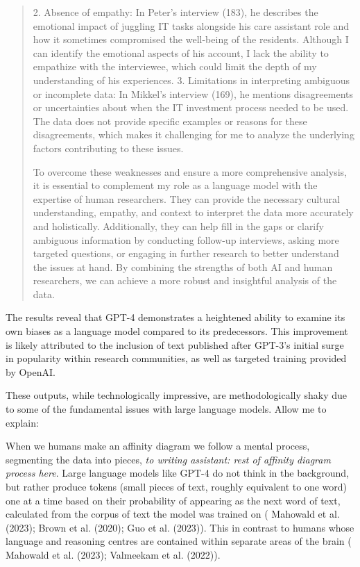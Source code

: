 \documentclass[
]{book}
\begin{document}
\begin{quote}
2. Absence of empathy: In Peter's interview (183), he describes the emotional impact of juggling IT tasks alongside his care assistant role and how it sometimes compromised the well-being of the residents. Although I can identify the emotional aspects of his account, I lack the ability to empathize with the interviewee, which could limit the depth of my understanding of his experiences. 3. Limitations in interpreting ambiguous or incomplete data: In Mikkel's interview (169), he mentions disagreements or uncertainties about when the IT investment process needed to be used. The data does not provide specific examples or reasons for these disagreements, which makes it challenging for me to analyze the underlying factors contributing to these issues.

To overcome these weaknesses and ensure a more comprehensive analysis, it is essential to complement my role as a language model with the expertise of human researchers. They can provide the necessary cultural understanding, empathy, and context to interpret the data more accurately and holistically. Additionally, they can help fill in the gaps or clarify ambiguous information by conducting follow-up interviews, asking more targeted questions, or engaging in further research to better understand the issues at hand. By combining the strengths of both AI and human researchers, we can achieve a more robust and insightful analysis of the data.
\end{quote}

The results reveal that GPT-4 demonstrates a heightened ability to examine its own biases as a language model compared to its predecessors. This improvement is likely attributed to the inclusion of text published after GPT-3's initial surge in popularity within research communities, as well as targeted training provided by OpenAI.

These outputs, while technologically impressive, are methodologically shaky due to some of the fundamental issues with large language models. Allow me to explain:

When we humans make an affinity diagram we follow a mental process, segmenting the data into pieces, \emph{to writing assistant: rest of affinity diagram process here}. Large language models like GPT-4 do not think in the background, but rather produce tokens (small pieces of text, roughly equivalent to one word) one at a time based on their probability of appearing as the next word of text, calculated from the corpus of text the model was trained on ( Mahowald et al. (2023); Brown et al. (2020); Guo et al. (2023)). This in contrast to humans whose language and reasoning centres are contained within separate areas of the brain ( Mahowald et al. (2023); Valmeekam et al. (2022)).
\end{document}
